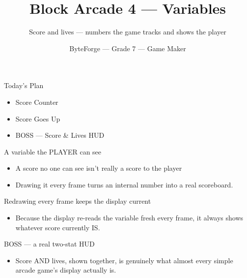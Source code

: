 \documentclass[aspectratio=169]{beamer}
\title{Block Arcade 4 — Variables}
\subtitle{Score and lives — numbers the game tracks and shows the player}
\author{ByteForge --- Grade 7 --- Game Maker}
\date{}
\begin{document}
\begin{frame}
    \titlepage
\end{frame}

\begin{frame}{Today's Plan}
    \begin{itemize}
        \item Score Counter
        \item Score Goes Up
        \item[$\bigstar$] BOSS --- Score \& Lives HUD
    \end{itemize}
\end{frame}

\begin{frame}{A variable the PLAYER can see}
    \large
    \begin{itemize}
        \item A score no one can see isn't really a score to the player
        \item Drawing it every frame turns an internal number into a real scoreboard.
    \end{itemize}
\end{frame}


\begin{frame}{Redrawing every frame keeps the display current}
    \large
    \begin{itemize}
        \item Because the display re-reads the variable fresh every frame, it always shows whatever score currently IS.
    \end{itemize}
\end{frame}


\begin{frame}{BOSS — a real two-stat HUD}
    \large
    \begin{itemize}
        \item Score AND lives, shown together, is genuinely what almost every simple arcade game's display actually is.
    \end{itemize}

    \begin{center}
    \end{center}
\end{frame}
\end{document}
